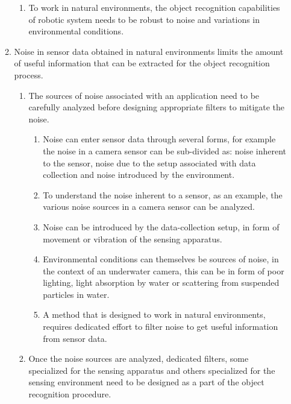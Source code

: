 \documentclass {udthesis}
\begin{document}
\begin{enumerate}[label=Chapter \arabic*:]
\begin{enumerate}[label=Section \arabic*:, start=0]
\begin{enumerate}[label=Para \arabic*:, start=1]
      \item To work in natural environments, the object recognition capabilities of robotic system needs to be robust to noise and variations in  environmental conditions.
      
    \end{enumerate}

  \item Noise in sensor data obtained in natural environments limits the amount of useful information that can be extracted for the object recognition process.
    
    \begin{enumerate}[label=Subsection \arabic*:, start=1]
      \item The sources of noise associated with an application need to be carefully analyzed before designing appropriate filters to mitigate the noise.
      
      \begin{enumerate}[label=Para \arabic*:, start=1]
	
	\item Noise can enter sensor data through several forms, for example the noise in a camera sensor can be sub-divided as: noise inherent to the sensor, noise due to the setup associated with data collection and noise introduced by the environment.
	
	\item To understand the noise inherent to a sensor, as an example, the various noise sources in a camera sensor can be analyzed.
	
	\item Noise can be introduced by the data-collection setup, in form of movement or vibration of the sensing apparatus.
	
	\item Environmental conditions can themselves be sources of noise, in the context of an underwater camera, this can be in form of poor lighting, light absorption by water or scattering from suspended particles in water.
	
	\item A method that is designed to work in natural environments, requires dedicated effort to filter noise to get useful information from sensor data.
	
      \end{enumerate}
    
      \item Once the noise sources are analyzed, dedicated filters, some specialized for the sensing apparatus and others specialized for the sensing environment need to be designed as a part of the object recognition procedure.


\end{enumerate}
\end{enumerate}
\end{enumerate}
\end{document}
